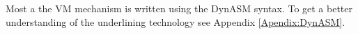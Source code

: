 Most a the VM mechanism is written using the DynASM syntax. To get a better
understanding of the underlining technology see Appendix \ref{Apendix:DynASM}.